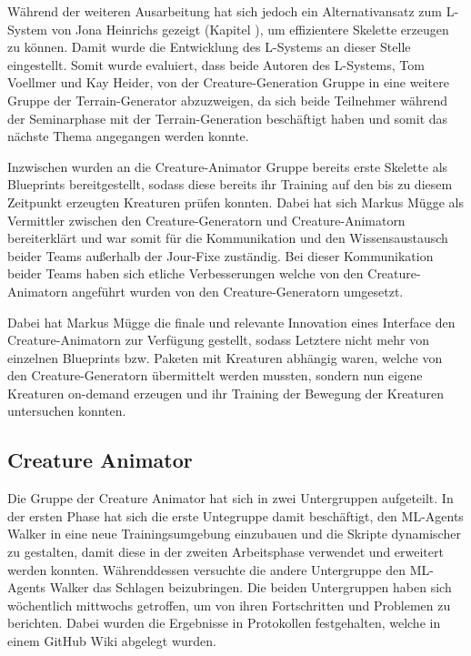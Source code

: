 Während der weiteren Ausarbeitung hat sich jedoch ein Alternativansatz zum L-System von Jona Heinrichs gezeigt (Kapitel ), um effizientere Skelette erzeugen zu können. Damit wurde die Entwicklung des L-Systems an dieser Stelle eingestellt. Somit wurde evaluiert, dass beide Autoren des L-Systems, Tom Voellmer und Kay Heider, von der Creature-Generation Gruppe in eine weitere Gruppe der Terrain-Generator abzuzweigen, da sich beide Teilnehmer während der Seminarphase mit der Terrain-Generation beschäftigt haben und somit das nächste Thema angegangen werden konnte.

Inzwischen wurden an die Creature-Animator Gruppe bereits erste Skelette als Blueprints bereitgestellt, sodass diese bereits ihr Training auf den bis zu diesem Zeitpunkt erzeugten Kreaturen prüfen konnten. Dabei hat sich Markus Mügge als Vermittler zwischen den Creature-Generatorn und Creature-Animatorn bereiterklärt und war somit für die Kommunikation und den Wissensaustausch beider Teams außerhalb der Jour-Fixe zuständig. Bei dieser Kommunikation beider Teams haben sich etliche Verbesserungen welche von den Creature-Animatorn angeführt wurden von den Creature-Generatorn umgesetzt. 

Dabei hat Markus Mügge die finale und relevante Innovation eines Interface den Creature-Animatorn zur Verfügung gestellt, sodass Letztere nicht mehr von einzelnen Blueprints bzw. Paketen mit Kreaturen abhängig waren, welche von den Creature-Generatorn übermittelt werden mussten, sondern nun eigene Kreaturen on-demand erzeugen und ihr Training der Bewegung der Kreaturen untersuchen konnten.



\subsection{Creature Animator}\label{sec:creature-animation-orga}
Die Gruppe der Creature Animator hat sich in zwei Untergruppen aufgeteilt. In der ersten Phase hat sich die erste Untegruppe damit beschäftigt, den ML-Agents Walker in eine neue Trainingsumgebung einzubauen und die Skripte dynamischer zu gestalten, damit diese in der zweiten Arbeitsphase verwendet und erweitert werden konnten. Währenddessen versuchte die andere Untergruppe den ML-Agents Walker das Schlagen beizubringen. Die beiden Untergruppen haben sich wöchentlich mittwochs getroffen, um von ihren Fortschritten und Problemen zu berichten. Dabei wurden die Ergebnisse in Protokollen festgehalten, welche in einem GitHub Wiki abgelegt wurden.

